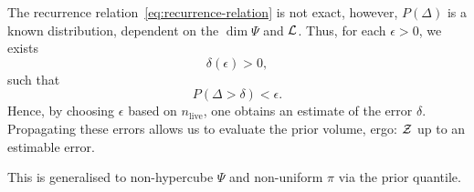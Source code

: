 \documentclass[usenatbib]{mnras}
\begin{document}
The recurrence relation~\eqref{eq:recurrence-relation} is not exact,
however, \(P(\Delta)\) is a known distribution, dependent on the
\(\dim \Psi\) and \({\cal L}\). Thus, for each \(\epsilon>0\), we
exists
\[\delta(\epsilon) >0,\] such that \[P(\Delta > \delta)<\epsilon.\]
Hence, by choosing \(\epsilon\) based on \(n_\text{live}\), one
obtains an estimate of the error \(\delta\). Propagating these errors
allows us to evaluate the prior volume, ergo: ${\cal Z}$ up to an
estimable error.

This is generalised to non-hypercube $\Psi$ and non-uniform $\pi$ via
the prior quantile. 
\end{document}
